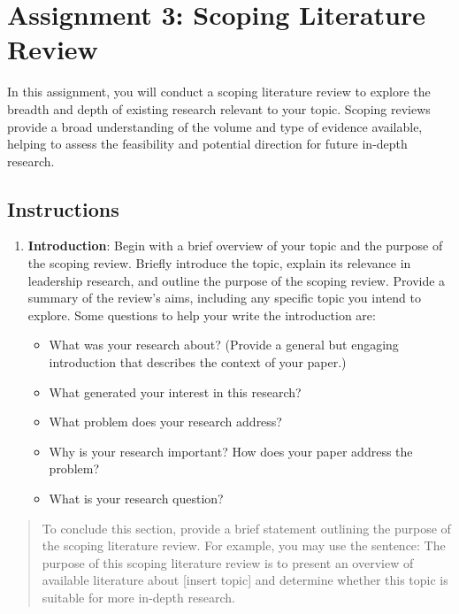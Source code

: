 \documentclass[
  letterpaper,
  DIV=11,
  numbers=noendperiod]{scrreprt}
\providecommand{\tightlist}{%
  \setlength{\itemsep}{0pt}\setlength{\parskip}{0pt}}\usepackage{longtable,booktabs,array}
\begin{document}

\chapter{Assignment 3: Scoping Literature
Review}\label{assignment-3-scoping-literature-review}

In this assignment, you will conduct a scoping literature review to
explore the breadth and depth of existing research relevant to your
topic. Scoping reviews provide a broad understanding of the volume and
type of evidence available, helping to assess the feasibility and
potential direction for future in-depth research.

\section{Instructions}\label{instructions-6}

\begin{enumerate}
\def\labelenumi{\arabic{enumi}.}
\tightlist
\item
  \textbf{Introduction}: Begin with a brief overview of your topic and
  the purpose of the scoping review. Briefly introduce the topic,
  explain its relevance in leadership research, and outline the purpose
  of the scoping review. Provide a summary of the review's aims,
  including any specific topic you intend to explore. Some questions to
  help your write the introduction are:

  \begin{itemize}
  \tightlist
  \item
    What was your research about? (Provide a general but engaging
    introduction that describes the context of your paper.)
  \item
    What generated your interest in this research?
  \item
    What problem does your research address?
  \item
    Why is your research important? How does your paper address the
    problem?
  \item
    What is your research question?
  \end{itemize}
\end{enumerate}

\begin{quote}
To conclude this section, provide a brief statement outlining the
purpose of the scoping literature review. For example, you may use the
sentence: The purpose of this scoping literature review is to present an
overview of available literature about {[}insert topic{]} and determine
whether this topic is suitable for more in-depth research.
\end{quote}
\end{document}
